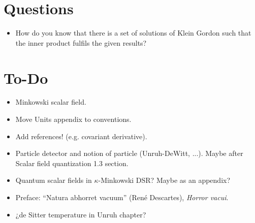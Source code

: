 \section{Questions}
\begin{itemize}
	\item How do you know that there is a set of solutions of Klein Gordon such that the inner product fulfils the given results?
\end{itemize}
\section{To-Do}
\begin{itemize}
	\item Minkowski scalar field.
	\item Move Units appendix to conventions.
	\item Add references! (e.g. covariant derivative).
	\item Particle detector and notion of particle (Unruh-DeWitt, ...). Maybe after Scalar field quantization 1.3 section.
	\item Quantum scalar fields in $\kappa$-Minkowski DSR? Maybe as an appendix? 
	\item Preface:	“Natura abhorret vacuum” (René Descartes), \textit{Horror vacui}.
	\item ¿de Sitter temperature in Unruh chapter?
\end{itemize}